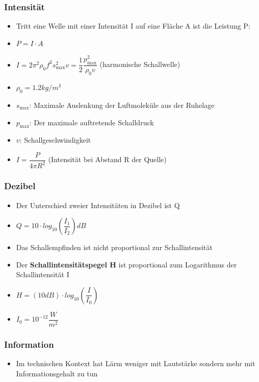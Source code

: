 \documentclass[8pt,a4paper]{scrartcl}
\begin{document}
\begin{multicols*}{3}
							\subsubsection{Intensität}	
								\begin{itemize}\itemsep0pt
									\item Tritt eine Welle mit einer Intensität I auf eine Fläche A ist die Leistung P:
									\item $P=I\cdot A$
									\item $I = 2\pi^{2}\rho_{0}f^{2}s_{\text{max}}^{2}v = \dfrac{1}{2}\dfrac{p_{\text{max}}^{2}}{\rho_{0}v}$ (harmonische Schallwelle)
									\item $\rho_{0} = 1.2 kg/m^{3}$
									\item $s_{\text{max}}$: Maximale Auslenkung der Luftmoleküle aus der Ruhelage
									\item $p_{\text{max}}$: Der maximale auftretende Schalldruck
									\item $v$: Schallgeschwindigkeit
									\item $I=\dfrac{P}{4\pi R^{2}}$ (Intensität bei Abstand R der Quelle)
								\end{itemize}	
							
							\subsubsection{Dezibel}
								\begin{itemize}\itemsep0pt
									\item Der Unterschied zweier Intensitäten in Dezibel ist Q
									\item $Q = 10 \cdot log_{10}(\dfrac{I_{1}}{I_{2}}) dB$
									\item Das Schallempfinden ist nicht proportional zur Schallintensität
									\item Der \textbf{Schallintensitätspegel H} ist proportional zum Logarithmus der Schallintensität I
									\item $H = (10dB) \cdot log_{10}(\dfrac{I}{I_{0}})$
									\item $I_{0} = 10^{-12}\dfrac{W}{m^{2}}$
								\end{itemize}	
								
							\subsubsection{Information}
								\begin{itemize}\itemsep0pt
									\item Im technischen Kontext hat Lärm weniger mit Lautstärke sondern mehr mit Informationsgehalt zu tun
								\end{itemize}	
								

\end{multicols*}
\end{document}
